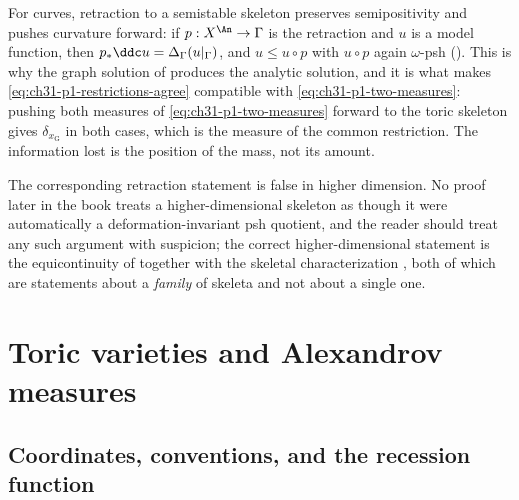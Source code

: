 \begin{remark}
\label{rem:ch31-retraction}
For curves, retraction to a semistable skeleton preserves semipositivity and
pushes curvature forward: if \(p:X^{\An}\to\Gamma\) is the retraction and
\(u\) is a model function, then \(p_*\ddc u=\Delta_\Gamma(u|_\Gamma)\), and
\(u\leq u\circ p\) with \(u\circ p\) again \(\omega\)-psh
().  This is why the graph solution of
 produces the analytic solution, and it is what
makes \eqref{eq:ch31-p1-restrictions-agree} compatible with
\eqref{eq:ch31-p1-two-measures}: pushing both measures of
\eqref{eq:ch31-p1-two-measures} forward to the toric skeleton gives
\(\delta_{x_{\mathrm G}}\) in both cases, which is the measure of the common
restriction.  The information lost is the position of the mass, not its
amount.

The corresponding retraction statement is false in higher dimension.  No
proof later in the book treats a higher-dimensional skeleton as though it
were automatically a deformation-invariant psh quotient, and the reader
should treat any such argument with suspicion; the correct higher-dimensional
statement is the equicontinuity of 
together with the skeletal characterization
, both of which are statements about
a \emph{family} of skeleta and not about a single one.
\end{remark}

\section{Toric varieties and Alexandrov measures}
\label{sec:ch31-toric}

\subsection{Coordinates, conventions, and the recession function}
\label{sec:ch31-toric-setup}

